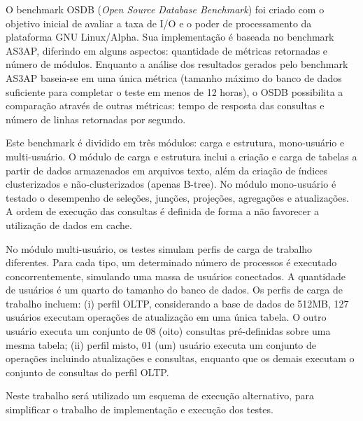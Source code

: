 O benchmark OSDB (\emph{Open Source Database Benchmark}) foi criado com o objetivo
inicial de avaliar a taxa de I/O e o poder de processamento da plataforma GNU
Linux/Alpha. Sua implementação é baseada no benchmark AS3AP, diferindo em alguns
aspectos: quantidade de métricas retornadas e número de módulos. Enquanto a análise
dos resultados gerados pelo benchmark AS3AP baseia-se em uma única métrica
(tamanho máximo do banco de dados suficiente para completar o teste em menos de 12
horas), o OSDB possibilita a comparação através de outras métricas: tempo de resposta
das consultas e número de linhas retornadas por segundo.

Este benchmark é dividido em três módulos: carga e estrutura, mono-usuário
e multi-usuário. O módulo de carga e estrutura inclui a criação e carga de tabelas a
partir de dados armazenados em arquivos texto, além da criação de índices clusterizados
e não-clusterizados (apenas B-tree). No módulo mono-usuário é testado o desempenho
de seleções, junções, projeções, agregações e atualizações. A ordem de execução das
consultas é definida de forma a não favorecer a utilização de dados em cache.

No módulo multi-usuário, os testes simulam perfis de carga de trabalho
diferentes. Para cada tipo, um determinado número de processos é executado
concorrentemente, simulando uma massa de usuários conectados. A quantidade de
usuários é um quarto do tamanho do banco de dados. Os perfis de carga de trabalho
incluem: (i) perfil OLTP, considerando a base de dados de 512MB, 127 usuários
executam operações de atualização em uma única tabela. O outro usuário executa um
conjunto de 08 (oito) consultas pré-definidas sobre uma mesma tabela; (ii) perfil misto,
01 (um) usuário executa um conjunto de operações incluindo atualizações e consultas,
enquanto que os demais executam o conjunto de consultas do perfil OLTP.

Neste trabalho será utilizado um esquema de execução alternativo, para simplificar o trabalho de implementação e execução dos testes.
